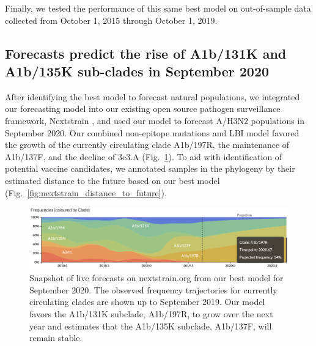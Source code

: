 Finally, we tested the performance of this same best model on out-of-sample data collected from October 1, 2015 through October 1, 2019.

\subsection*{Forecasts predict the rise of A1b/131K and A1b/135K sub-clades in September 2020}

After identifying the best model to forecast natural populations, we integrated our forecasting model into our existing open source pathogen surveillance framework, Nextstrain \cite{Hadfield2018}, and used our model to forecast A/H3N2 populations in September 2020.
Our combined non-epitope mutations and LBI model favored the growth of the currently circulating clade A1b/197R, the maintenance of A1b/137F, and the decline of 3c3.A (Fig.~\ref{fig:nextstrain_forecasts}).
To aid with identification of potential vaccine candidates, we annotated samples in the phylogeny by their estimated distance to the future based on our best model (Fig.~\ref{fig:nextstrain_distance_to_future}).

\begin{figure}[ht]
  \begin{center}
  \includegraphics[width=\textwidth]{figures/nextstrain-forecasts-for-september-2020.png}
  \caption{
    Snapshot of live forecasts on nextstrain.org from our best model for September 2020.
    The observed frequency trajectories for currently circulating clades are shown up to September 2019.
    Our model favors the A1b/131K subclade, A1b/197R, to grow over the next year and estimates that the A1b/135K subclade, A1b/137F, will remain stable.
  }
  \label{fig:nextstrain_forecasts}
  \end{center}
\end{figure}

